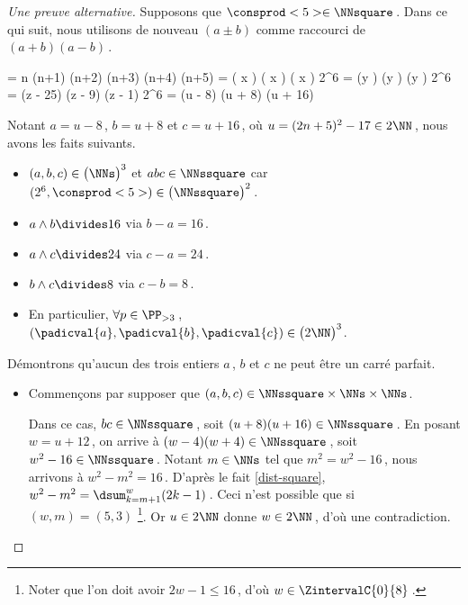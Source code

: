 \begin{proof}[Une preuve alternative]%
    Supposons que $\consprod<5> \in \NNsquare$\,. Dans ce qui suit, nous utilisons de nouveau $(a \pm b)$ comme raccourci de $(a + b) (a - b)$\,.

    \medskip
    \begin{stepcalc}[style = ar*, ope = \iff]
    	 = 
			n (n+1) (n+2) (n+3) (n+4) (n+5)
    	\consprod<5> = 
			\big( x \pm {} \big) \big( x \pm {} \big) \big( x \pm {} \big) 
    	2^6 \consprod<5> = 
			(y ) (y ) (y )
    	2^6 \consprod<5> = 
			(z - 25) (z - 9) (z - 1) 
    	2^6 \consprod<5> = 
			(u - 8) (u + 8) (u + 16)
    \end{stepcalc}

    \medskip
    Notant $a = u - 8$\,, $b = u + 8$ et $c = u + 16$\,, où $u = (2 n + 5)^2 - 17 \in 2 \NN$\,, nous avons les faits suivants.
    
    \begin{itemize}
		\item $(a, b, c) \in \big( \NNs \big)^3$ et $abc \in \NNssquare$ car $(2^6, \consprod<5>) \in \big( \NNssquare \big)^2$\,.

		\item $a \wedge b \divides 16$ via $b - a = 16$\,.

		\item $a \wedge c \divides 24$ via $c - a = 24$\,.

		\item $b \wedge c \divides 8$  via $c - b = 8$\,.

		\item En particulier, 
		$\forall p \in \PP_{>3}$\,, 
		$(\padicval{a}, \padicval{b}, \padicval{c}) \in \big( 2 \NN \big)^3$.
	\end{itemize}


	Démontrons qu'aucun des trois entiers $a$\,, $b$ et $c$ ne peut être un carré parfait.
	\begin{itemize}
		\medskip
		\item Commençons par supposer que $(a, b, c) \in \NNssquare \times \NNs \times \NNs$. 
		
		\smallskip
		\noindent
		Dans ce cas, $bc \in \NNssquare$\,, soit $(u + 8) (u + 16) \in \NNssquare$\,.
		En posant $w = u + 12$\,, on arrive à $(w - 4) (w + 4) \in \NNssquare$\,, soit $w^2 - 16 \in \NNssquare$\,.
		Notant $m \in \NNs$ tel que $m^2 = w^2 - 16$\,, nous arrivons à $w^2 - m^2 = 16$\,.
		D'après le fait \ref{dist-square}, $w^2 - m^2 = \dsum_{k=m+1}^{w} (2 k - 1)$\,.
		Ceci n'est possible que si $(w, m) = (5, 3)$
		\footnote{
			Noter que l'on doit avoir $2 w - 1 \leq 16$\,, d'où $w \in \ZintervalC{0}{8}$\,.
		}.
		Or $u \in 2 \NN$ donne $w \in 2 \NN$\,, d'où une contradiction.		
		

\end{itemize}
\end{proof}
